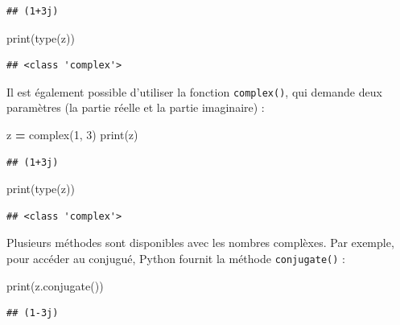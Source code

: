 \documentclass[12pt,]{book}
\newenvironment{Shaded}{\begin{snugshade}}{\end{snugshade}}
\newcommand{\DecValTok}[1]{\textcolor[rgb]{0.00,0.00,0.81}{#1}}
\newcommand{\OperatorTok}[1]{\textcolor[rgb]{0.81,0.36,0.00}{\textbf{#1}}}
\newcommand{\BuiltInTok}[1]{#1}
\newcommand{\NormalTok}[1]{#1}
\numberwithin{equation}{section}
\numberwithin{countremarque}{section}
\begin{document}
\begin{lstlisting}
## (1+3j)
\end{lstlisting}

\begin{Shaded}
\begin{Highlighting}[]
\BuiltInTok{print}\NormalTok{(}\BuiltInTok{type}\NormalTok{(z))}
\end{Highlighting}
\end{Shaded}

\begin{lstlisting}
## <class 'complex'>
\end{lstlisting}

Il est également possible d'utiliser la fonction \texttt{complex()}, qui
demande deux paramètres (la partie réelle et la partie imaginaire) :

\begin{Shaded}
\begin{Highlighting}[]
\NormalTok{z }\OperatorTok{=} \BuiltInTok{complex}\NormalTok{(}\DecValTok{1}\NormalTok{, }\DecValTok{3}\NormalTok{)}
\BuiltInTok{print}\NormalTok{(z)}
\end{Highlighting}
\end{Shaded}

\begin{lstlisting}
## (1+3j)
\end{lstlisting}

\begin{Shaded}
\begin{Highlighting}[]
\BuiltInTok{print}\NormalTok{(}\BuiltInTok{type}\NormalTok{(z))}
\end{Highlighting}
\end{Shaded}

\begin{lstlisting}
## <class 'complex'>
\end{lstlisting}

Plusieurs méthodes sont disponibles avec les nombres complèxes. Par
exemple, pour accéder au conjugué, Python fournit la méthode
\texttt{conjugate()} :

\begin{Shaded}
\begin{Highlighting}[]
\BuiltInTok{print}\NormalTok{(z.conjugate())}
\end{Highlighting}
\end{Shaded}

\begin{lstlisting}
## (1-3j)
\end{lstlisting}
\end{document}

